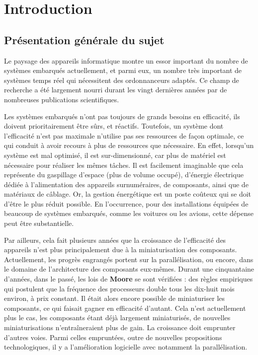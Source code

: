 \documentclass[11pt,a4paper,oneside]{report}
\newcommand{\customhighlight}[1]{{\textbf{#1}}}
\begin{document}
	
	\chapter{Introduction}{}
	\setcounter{page}{1}
	
	
	\section{Présentation générale du sujet}
	
	Le paysage des appareils informatique montre un essor important du nombre de systèmes 
	embarqués actuellement, et
	parmi eux, un nombre très important de systèmes temps réel qui 
	nécessitent des ordonnanceurs adaptés. 
	Ce champ de recherche a été largement nourri durant les vingt dernières années par de nombreuses publications scientifiques. \medskip
	
	Les systèmes embarqués n'ont pas toujours de grands besoins en efficacité, 
	ils doivent prioritairement être sûrs, et réactifs. 
	Toutefois, un système dont l'efficacité n'est pas maximale n'utilise pas 
	ses ressources de façon optimale, ce qui conduit à avoir recours à 
	plus de ressources que nécessaire. En effet, lorsqu'un système est 
	mal optimisé, il est sur-dimensionné, car plus de matériel est nécessaire 
	pour réaliser les mêmes tâches. Il est facilement imaginable que cela représente du 
	gaspillage d'espace (plus de volume occupé), 
	d'énergie électrique dédiée à l'alimentation des appareils surnuméraires, 
	de composants, ainsi que de matériaux de câblage.
	Or, la gestion énergétique 
	est un poste coûteux qui se doit d'être le plus réduit possible. 
	En l'occurrence, pour des installations équipées de beaucoup de systèmes embarqués, 
	comme les voitures ou les avions, cette dépense peut être substantielle. \medskip
	
	Par ailleurs, cela fait plusieurs années que la croissance de l'efficacité des 
	appareils n'est plus principalement due à la miniaturisation des composants. 
	Actuellement, les progrès engrangés portent sur la parallélisation, 
	ou encore, dans le domaine de l'architecture des composants eux-mêmes.
	Durant une cinquantaine d'années, dans le passé, les lois de \customhighlight{Moore}
	se sont vérifiées : des règles empiriques qui postulent que la fréquence des processeurs 
	double tous les dix-huit mois environ, à prix constant. 
	Il était alors encore possible de miniaturiser les composants, 
	ce qui faisait gagner en efficacité d'autant. 
	Cela n'est actuellement plus le cas, 
	les composants étant déjà largement miniaturisés, de nouvelles miniaturisations 
	n'entraîneraient plus de gain. La croissance doit emprunter d'autres voies. Parmi celles 
	empruntées, outre de nouvelles propositions technologiques, 
	il y a l'amélioration logicielle avec notamment la parallélisation.
	\medskip
	
\end{document}
